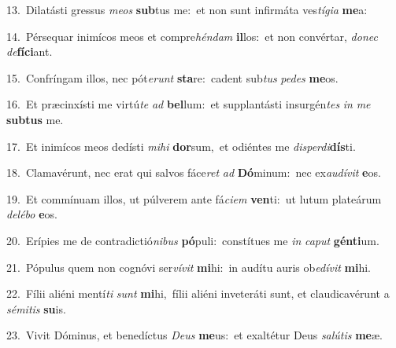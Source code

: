 {\numbfont\textcolor{\numbcolor}{13.}}~Dilatásti gressus \textit{me}\-\textit{os} \textbf{sub}\-tus me:~\star et non sunt infirmáta ves\-\textit{tí}\-\textit{gi}\textit{a} \textbf{me}\-a:\par
{\numbfont\textcolor{\numbcolor}{14.}}~Pérsequar inimícos meos et compre\-\textit{hén}\-\textit{dam} \textbf{il}\-los:~\star et non convértar, \textit{do}\-\textit{nec} \textit{de}\-\textbf{fí}\textbf{ci}ant.\par
{\numbfont\textcolor{\numbcolor}{15.}}~Confríngam illos, nec pót\-\textit{e}\-\textit{runt} \textbf{sta}\-re:~\star cadent sub\textit{tus} \textit{pe}\-\textit{des} \textbf{me}\-os.\par
{\numbfont\textcolor{\numbcolor}{16.}}~Et præcinxísti me virtú\textit{te} \textit{ad} \textbf{bel}\-lum:~\star et supplantásti insurgén\textit{tes} \textit{in} \textit{me} \textbf{sub}\-\textbf{tus} me.\par
{\numbfont\textcolor{\numbcolor}{17.}}~Et inimícos meos dedísti \textit{mi}\-\textit{hi} \textbf{dor}\-sum,~\star et odiéntes me \textit{dis}\-\textit{per}\textit{di}\textbf{dís}ti.\par
{\numbfont\textcolor{\numbcolor}{18.}}~Clamavérunt, nec erat qui salvos fáce\textit{ret} \textit{ad} \textbf{Dó}\-minum:~\star nec ex\-\textit{au}\-\textit{dí}\textit{vit} \textbf{e}\-os.\par
{\numbfont\textcolor{\numbcolor}{19.}}~Et commínuam illos, ut púlverem ante fá\-\textit{ci}\-\textit{em} \textbf{ven}\-ti:~\star ut lutum plateárum \textit{de}\-\textit{lé}\textit{bo} \textbf{e}\-os.\par
{\numbfont\textcolor{\numbcolor}{20.}}~Erípies me de contradictió\-\textit{ni}\-\textit{bus} \textbf{pó}\-puli:~\star constítues me \textit{in} \textit{ca}\-\textit{put} \textbf{gén}\-\textbf{ti}um.\par
{\numbfont\textcolor{\numbcolor}{21.}}~Pópulus quem non cognóvi ser\-\textit{ví}\-\textit{vit} \textbf{mi}\-hi:~\star in audítu auris ob\-\textit{e}\-\textit{dí}\textit{vit} \textbf{mi}\-hi.\par
{\numbfont\textcolor{\numbcolor}{22.}}~Fílii aliéni mentí\textit{ti} \textit{sunt} \textbf{mi}\-hi,~\star fílii aliéni inveteráti sunt, et claudicavérunt a \textit{sé}\-\textit{mi}\textit{tis} \textbf{su}\-is.\par
{\numbfont\textcolor{\numbcolor}{23.}}~Vivit Dóminus, et benedíctus \textit{De}\-\textit{us} \textbf{me}\-us:~\star et exaltétur Deus \textit{sa}\-\textit{lú}\textit{tis} \textbf{me}\-æ.\par
